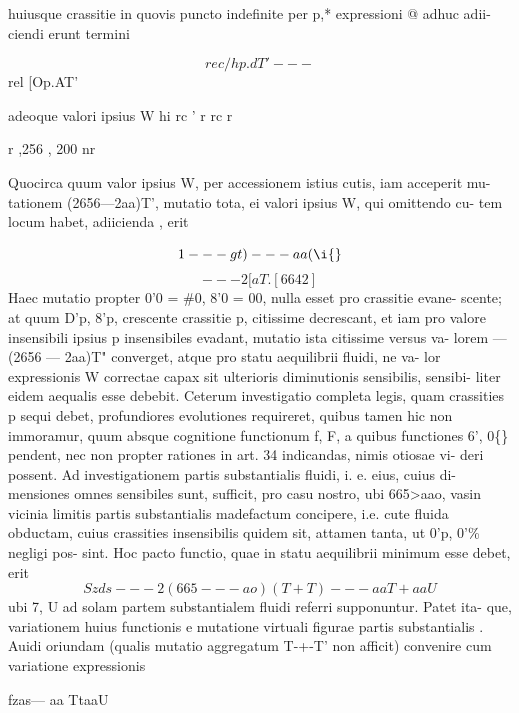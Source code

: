\documentclass[12pt,a4paper]{article}
\begin{document}
huiusque crassitie in quovis puncto indefinite per p,* expressioni @ adhuc adii-
ciendi erunt termini

\[                              rec/hp.dT'---\]
rel [Op.AT'

adeoque valori ipsius W hi
rc       '          r       rc               r



r       ,256       ,        200    nr




Quocirca quum valor ipsius      W, per accessionem istius cutis, iam acceperit mu-
tationem   (2656---2aa)T',       mutatio tota, ei valori ipsius                        W,   qui omittendo cu-
tem locum habet,     adiicienda , erit

\[                                   1--- gt)---aa(\i\{\}\]
\[                           --- 2[aT.[66                                            42]\]
Haec mutatio propter      0'0 = \#0, 8'0 = 00,                        nulla esset pro crassitie evane-
scente; at quum D'p, 8'p, crescente crassitie p, citissime decrescant, et iam pro
valore insensibili ipsius p insensibiles evadant, mutatio ista citissime versus va-
lorem ---       (2656
--- 2aa)T" converget, atque pro statu aequilibrii fluidi, ne va-
lor expressionis   W correctae capax sit ulterioris diminutionis sensibilis, sensibi-
liter eidem aequalis esse debebit.    Ceterum investigatio completa legis, quam
crassities p sequi debet, profundiores evolutiones requireret, quibus tamen hic
non immoramur, quum absque cognitione functionum f, F, a quibus functiones
6', 0\textdegree\{\} pendent, nec non propter rationes in art. 34 indicandas, nimis otiosae vi-
deri possent. Ad investigationem partis substantialis fluidi, i. e. eius, cuius di-
mensiones omnes sensibiles sunt, sufficit, pro casu nostro, ubi 665>aao, vasin
vicinia limitis partis substantialis madefactum concipere, i.e. cute fluida obductam,
cuius crassities insensibilis quidem sit, attamen tanta, ut 0'p, 0'\% negligi pos-
sint. Hoc pacto functio, quae in statu aequilibrii minimum esse debet, erit
\[                     Szds--- 2(665---ao)(T+T)---aaT+aaU\]
ubi 7, U ad solam partem substantialem fluidi referri supponuntur.                                Patet ita-
que, variationem huius functionis e mutatione virtuali figurae partis substantialis
. Auidi oriundam (qualis mutatio aggregatum                       T-+-T' non afficit) convenire cum
variatione expressionis


fzas--- aa TtaaU
\end{document}
